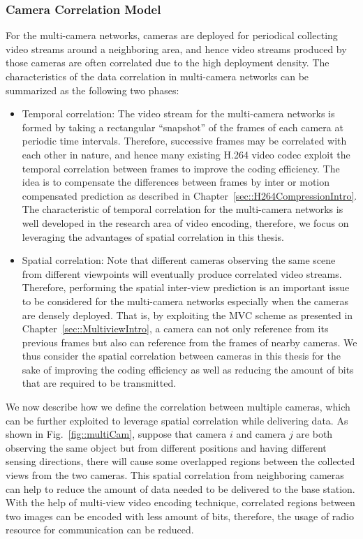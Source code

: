 \subsubsection{Camera Correlation Model}
%
For the multi-camera networks, cameras are deployed for periodical collecting video streams around a neighboring area, and hence video streams produced by those cameras are often correlated due to the high deployment density.
The characteristics of the data correlation in multi-camera networks can be summarized as the following two phases:
\begin{itemize}
\item Temporal correlation: The video stream for the multi-camera networks is formed by taking a rectangular ``snapshot'' of the frames of each camera at periodic time intervals.
Therefore, successive frames may be correlated with each other in nature, and hence many existing H.264 video codec exploit the temporal correlation between frames to improve the coding efficiency.
The idea is to compensate the differences between frames by inter or motion compensated prediction as described in Chapter~\ref{sec::H264CompressionIntro}.
The characteristic of temporal correlation for the multi-camera networks is well developed in the research area of video encoding, therefore, we focus on leveraging the advantages of spatial correlation in this thesis.
\item Spatial correlation: Note that different cameras observing the same scene from different viewpoints will eventually produce correlated video streams.
Therefore, performing the spatial inter-view prediction is an important issue to be considered for the multi-camera networks especially when the cameras are densely deployed.
That is, by exploiting the MVC scheme as presented in Chapter~\ref{sec::MultiviewIntro}, a camera can not only reference from its previous frames but also can reference from the frames of nearby cameras.
We thus consider the spatial correlation between cameras in this thesis for the sake of improving the coding efficiency as well as reducing the amount of bits that are required to be transmitted.  
\end{itemize}
%
We now describe how we define the correlation between multiple cameras, which can be further exploited to leverage spatial correlation while delivering data.
As shown in Fig.~\ref{fig::multiCam}, suppose that camera $i$ and camera $j$ are both observing the same object but from different positions and having different sensing directions, there will cause some overlapped regions between the collected views from the two cameras.
This spatial correlation from neighboring cameras can help to reduce the amount of data needed to be delivered to the base station.
With the help of multi-view video encoding technique, correlated regions between two images can be encoded with less amount of bits, therefore, the usage of radio resource for communication can be reduced.

